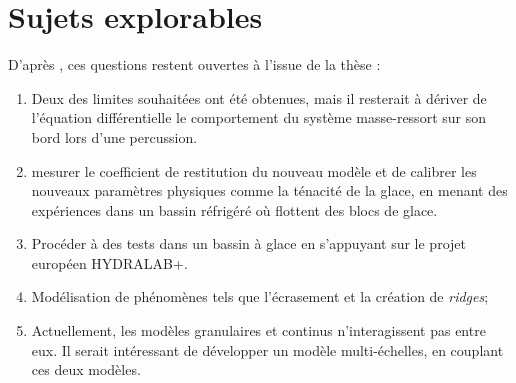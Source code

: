 \documentclass[
  french,
	11pt, %
]{fphw}
\begin{document}

\section{Sujets explorables}

D'après \parencite{balasoiu2020thesis}, ces questions restent ouvertes à l'issue de la thèse :
\begin{enumerate}
  \item Deux des limites souhaitées ont été obtenues, mais il resterait à dériver de l’équation différentielle le comportement du système masse-ressort sur son bord lors d’une percussion.
  \item mesurer le coefficient de restitution du nouveau modèle et de calibrer les nouveaux paramètres physiques comme
  la ténacité de la glace, en menant des expériences dans un bassin réfrigéré où flottent des blocs de glace.
  \item Procéder à des tests dans un bassin à glace en s’appuyant sur le projet européen HYDRALAB+.
  \item Modélisation de phénomènes tels que l’écrasement et la création de \textit{ridges};
  \item Actuellement, les modèles granulaires et continus n’interagissent pas
  entre eux. Il serait intéressant de développer un modèle multi-échelles, en couplant ces deux modèles.
  
\end{enumerate}

\clearpage   %
\printbibliography
\end{document}
